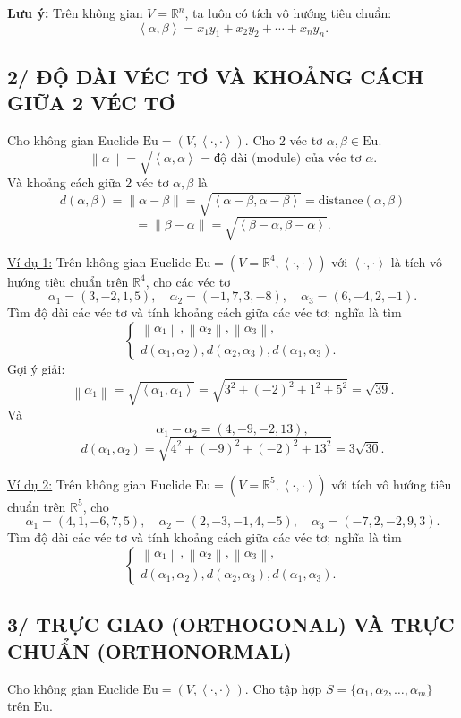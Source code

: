 \documentclass[12pt,a4paper]{article}
\newcommand{\R}{\mathbb{R}}
\newcommand{\Eu}{\mathrm{Eu}}
\newcommand{\ip}[2]{\left\langle #1,#2\right\rangle}
\newcommand{\norm}[1]{\left\lVert #1\right\rVert}
\newcommand{\dist}{\mathrm{distance}}
\begin{document}
\textbf{Lưu ý:} Trên không gian $V=\R^n$, ta luôn có tích vô hướng tiêu chuẩn:
\[
\ip{\alpha}{\beta}=x_1y_1+x_2y_2+\cdots+x_ny_n.
\]

\subsection*{2/ ĐỘ DÀI VÉC TƠ VÀ KHOẢNG CÁCH GIỮA 2 VÉC TƠ}
Cho không gian Euclide $\Eu=(V,\ip{\cdot}{\cdot})$. Cho 2 véc tơ $\alpha,\beta\in\Eu$.
\[
\norm{\alpha}=\sqrt{\ip{\alpha}{\alpha}}=\text{độ dài (module) của véc tơ }\alpha.
\]
Và khoảng cách giữa 2 véc tơ $\alpha,\beta$ là
\[
d(\alpha,\beta)=\norm{\alpha-\beta}=\sqrt{\ip{\alpha-\beta}{\alpha-\beta}}=\dist(\alpha,\beta)
\]
\[
=\norm{\beta-\alpha}=\sqrt{\ip{\beta-\alpha}{\beta-\alpha}}.
\]

\underline{Ví dụ 1:} Trên không gian Euclide $\Eu=(V=\R^4,\ip{\cdot}{\cdot})$ với $\ip{\cdot}{\cdot}$ là tích vô hướng tiêu chuẩn trên $\R^4$, cho các véc tơ
\[
\alpha_1=(3,-2,1,5),\quad \alpha_2=(-1,7,3,-8),\quad \alpha_3=(6,-4,2,-1).
\]
Tìm độ dài các véc tơ và tính khoảng cách giữa các véc tơ; nghĩa là tìm
\[
\left\{\begin{array}{l}
\norm{\alpha_1},\norm{\alpha_2},\norm{\alpha_3},\\
d(\alpha_1,\alpha_2),d(\alpha_2,\alpha_3),d(\alpha_1,\alpha_3).
\end{array}\right.
\]
Gợi ý giải:
\[
\norm{\alpha_1}=\sqrt{\ip{\alpha_1}{\alpha_1}}=\sqrt{3^2+(-2)^2+1^2+5^2}=\sqrt{39}.
\]
Và
\[
\alpha_1-\alpha_2=(4,-9,-2,13),
\]
\[
d(\alpha_1,\alpha_2)=\sqrt{4^2+(-9)^2+(-2)^2+13^2}=3\sqrt{30}.
\]

\underline{Ví dụ 2:} Trên không gian Euclide $\Eu=(V=\R^5,\ip{\cdot}{\cdot})$ với tích vô hướng tiêu chuẩn trên $\R^5$, cho
\[
\alpha_1=(4,1,-6,7,5),\quad \alpha_2=(2,-3,-1,4,-5),\quad \alpha_3=(-7,2,-2,9,3).
\]
Tìm độ dài các véc tơ và tính khoảng cách giữa các véc tơ; nghĩa là tìm
\[
\left\{\begin{array}{l}
\norm{\alpha_1},\norm{\alpha_2},\norm{\alpha_3},\\
d(\alpha_1,\alpha_2),d(\alpha_2,\alpha_3),d(\alpha_1,\alpha_3).
\end{array}\right.
\]

\subsection*{3/ TRỰC GIAO (ORTHOGONAL) VÀ TRỰC CHUẨN (ORTHONORMAL)}
Cho không gian Euclide $\Eu=(V,\ip{\cdot}{\cdot})$.
Cho tập hợp $S=\{\alpha_1,\alpha_2,\ldots,\alpha_m\}$ trên $\Eu$.
\end{document}
